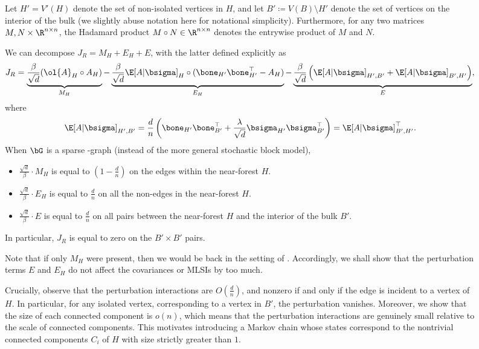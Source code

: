 \documentclass[11pt,letterpaper]{article}
\begin{document}
\begin{figure}
Let $H' = V'(H)$ denote the set of non-isolated vertices in $H$, and let $B' \coloneqq V(B) \setminus H'$ denote the set of vertices on the interior of the bulk (we slightly abuse notation here for notational simplicity).
Furthermore, for any two matrices $M, N \times \R^{n \times n}$, the Hadamard product $M \circ N \in \R^{n \times n}$ denotes the entrywise product of $M$ and $N$. 

We can decompose $J_R = M_H + E_H + E$, with the latter defined explicitly as 
\begin{align}
    J_R &= \underbrace{\frac{\beta}{\sqrt{d}}(\ol{A}_{H} \circ A_H)}_{M_{H}} - \underbrace{\frac{\beta}{\sqrt{d}}\E[A|\bsigma]_{H} \circ (\bone_{H'} \bone_{H'}^\top - A_H)}_{E_H} - \underbrace{\frac{\beta}{\sqrt{d}} \left(\E[A|\bsigma]_{H', B'} + \E[A|\bsigma]_{B', H'}\right) }_{E} \label{eq:new-Jb},
\end{align}
where
\[ \E[A|\bsigma]_{H', B'} = \frac{d}{n}\left(\bone_{H'} \bone_{B'}^\top + \frac{\lambda}{\sqrt{d}}\bsigma_{H'}\bsigma_{B'}^\top\right) = \E[A|\bsigma]_{B', H'}^\top. \]
When $\bG$ is a sparse \erdos-\renyi graph (instead of the more general stochastic block model),
\begin{itemize}
    \item $\frac{\sqrt{d}}{\beta} \cdot M_H$ is equal to $\left( 1 - \frac{d}{n} \right)$ on the edges within the near-forest $H$.
    \item $\frac{\sqrt{d}}{\beta} \cdot E_H$ is equal to $\frac{d}{n}$ on all the non-edges in the near-forest $H$.
    \item $\frac{\sqrt{d}}{\beta} \cdot E$ is equal to $\frac{d}{n}$ on all pairs between the near-forest $H$ and the interior of the bulk $B'$.
\end{itemize}
In particular, $J_R$ is equal to zero on the $B' \times B'$ pairs.
 
Note that if only $M_H$ were present, then we would be back in the setting of .
Accordingly, we shall show that the perturbation terms $E$ and $E_H$ do not affect the covariances or MLSIs by too much.

Crucially, observe that the perturbation interactions are $O\left(\frac{d}{n}\right)$, and nonzero if and only if the edge is incident to a vertex of $H$. 
In particular, for any isolated vertex, corresponding to a vertex in $B'$, the perturbation vanishes. 
Moreover, we show that the size of each connected component is $o(n)$, which means that the perturbation interactions are genuinely small relative to the scale of connected components. 
This motivates introducing a Markov chain whose states correspond to the nontrivial connected components $C_i$ of $H$ with size strictly greater than $1$.


\end{figure}
\end{document}
